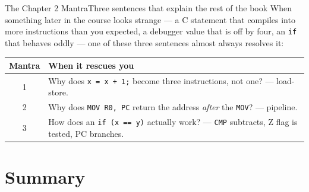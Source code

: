 \documentclass[9pt,aspectratio=169,xcolor=table]{beamer}
\newcommand{\striped}{\rowcolors{1}{white}{stripe}}
\begin{document}
\begin{frame}{The Chapter 2 Mantra}{Three sentences that explain the rest of the book}
    \leavevmode
    When something later in the course looks strange --- a C statement that compiles into more instructions than you expected, a debugger value that is off by four, an \texttt{if} that behaves oddly --- one of these three sentences almost always resolves it:

    \vspace{5mm}
    \begin{center}
    \end{center}

    \vspace{3mm}
    \begin{center}
    {\footnotesize
    \striped
    \begin{tabular}{@{}c R{.72\textwidth}@{}}
        \toprule
        \textbf{Mantra} & \textbf{When it rescues you} \\
         & Why does \texttt{x = x + 1;} become three instructions, not one? --- load-store. \\
        2 & Why does \texttt{MOV R0, PC} return the address \emph{after} the \texttt{MOV}? --- pipeline. \\
        3 & How does an \texttt{if (x == y)} actually work? --- \texttt{CMP} subtracts, Z flag is tested, PC branches. \\
        \bottomrule
    \end{tabular}}
    \end{center}
\end{frame}

\section{Summary}
\end{document}
